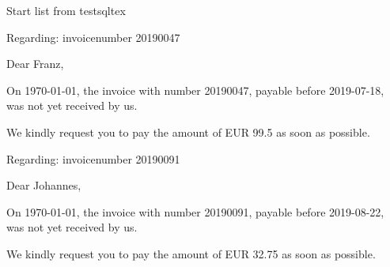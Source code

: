 \documentclass[a4paper]{article}
\begin{document}
Start list from testsqltex




\begin{flushright}

Regarding: invoicenumber 20190047

\end{flushright}

\vspace{3cm}

Dear Franz,

\vspace{2cm}

On \today, the invoice with number 20190047, payable before
2019-07-18, was not yet received by us.

\vspace{5mm}

We kindly request you to pay the amount of EUR 99.5
as soon as possible.

\newpage


\begin{flushright}

Regarding: invoicenumber 20190091

\end{flushright}

\vspace{3cm}

Dear Johannes,

\vspace{2cm}

On \today, the invoice with number 20190091, payable before
2019-08-22, was not yet received by us.

\vspace{5mm}

We kindly request you to pay the amount of EUR 32.75
as soon as possible.

\newpage
\end{document}
